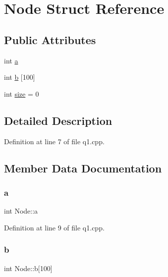 \hypertarget{struct_node}{}\section{Node Struct Reference}
\label{struct_node}
\subsection*{Public Attributes}
\begin{DoxyCompactItemize}
\item 
int \hyperlink{struct_node_a2fdf3febffa37539c09d0a282525033a}{a}
\item 
int \hyperlink{struct_node_a26cb9e26541900f36489bf503338ce4e}{b} \mbox{[}100\mbox{]}
\item 
int \hyperlink{struct_node_acc103d220defd2fdb5aac8e3b03424c6}{size} = 0
\end{DoxyCompactItemize}


\subsection{Detailed Description}


Definition at line 7 of file q1.\+cpp.



\subsection{Member Data Documentation}
\mbox{\label{struct_node_a2fdf3febffa37539c09d0a282525033a}} 
\subsubsection{\texorpdfstring{a}{a}}
{\footnotesize\ttfamily int Node\+::a}



Definition at line 9 of file q1.\+cpp.

\mbox{\label{struct_node_a26cb9e26541900f36489bf503338ce4e}} 
\subsubsection{\texorpdfstring{b}{b}}
{\footnotesize\ttfamily int Node\+::b\mbox{[}100\mbox{]}}




